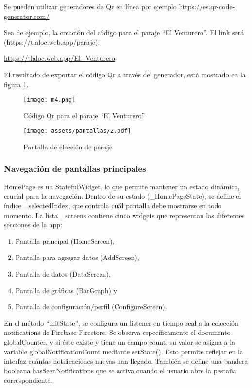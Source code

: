 Se pueden utilizar generadores de Qr en línea por ejemplo \url{https://es.qr-code-generator.com/}.

  Sea de ejemplo, la creación del código para el paraje ``El Venturero''. El link será (https://tlaloc.web.app/paraje):
  \begin{center}
    \url{https://tlaloc.web.app/El_Venturero}
  \end{center}
  El resultado de exportar el código Qr a través del generador, está mostrado en la figura \ref{m4}.
  \begin{figure}[h!]
  \centering
    \texttt{[image: m4.png]}
    \caption{Código Qr para el paraje ``El Venturero''}
    \label{m4}
  \end{figure} 


\begin{figure}[h!]
\centering
  \texttt{[image: assets/pantallas/2.pdf]}
  \caption{Pantalla de elección de paraje}
  \label{pantallas3}
\end{figure}
\newpage




\newpage
\subsubsection*{Navegación de pantallas principales}

HomePage es un StatefulWidget, lo que permite mantener un estado dinámico, crucial para la navegación. Dentro de su estado (\_HomePageState), se define el índice \_selectedIndex, que controla cuál pantalla debe mostrarse en todo momento. La lista \_screens contiene cinco widgets que representan las diferentes secciones de la app: 
\begin{enumerate}
  \item Pantalla principal (HomeScreen),
  \item Pantalla para agregar datos (AddScreen),
  \item Pantalla de datos (DataScreen), 
  \item Pantalla de gráficas (BarGraph) y
  \item Pantalla de configuración/perfil (ConfigureScreen).
\end{enumerate}

En el método ``initState'', se configura un listener en tiempo real a la colección notifications de Firebase Firestore. Se observa específicamente el documento globalCounter, y si éste existe y tiene un campo count, su valor se asigna a la variable globalNotificationCount mediante setState(). Esto permite reflejar en la interfaz cuántas notificaciones nuevas han llegado. También se define una bandera booleana hasSeenNotifications que se activa cuando el usuario abre la pestaña correspondiente.

